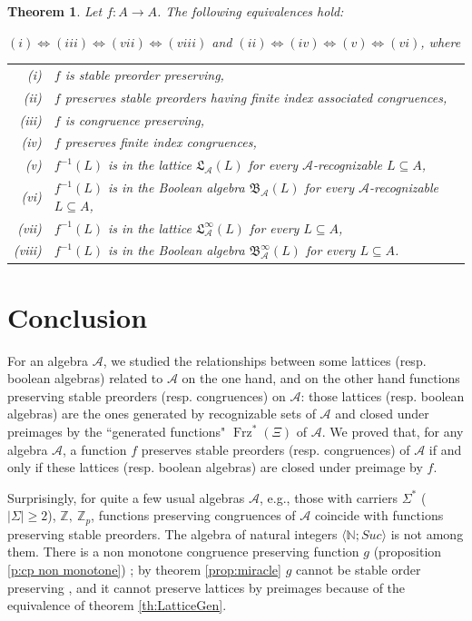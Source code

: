 \documentclass[11pt,a4paper]{article}
\newtheorem{theorem}{Theorem}[section]
\theoremstyle{definition} %
\newcommand\+[1]{\mathcal{#1}} %
\newcommand{\N}{{\mathbb N}}     %
\newcommand{\Z}{{\mathbb Z}}     %
\newcommand{\Bool}{{\mathfrak{B}}}   %
\newcommand{\Latt}{{\mathfrak{L}}}
\DeclareMathOperator{\freez}{Frz}%
\begin{document}
 \begin{theorem}\label{th Zhat}
 Let $f\colon  A\to A$. The following  equivalences hold:
 
  $(i)\Leftrightarrow(iii)\Leftrightarrow(vii)\Leftrightarrow(viii)$\quad
 and\quad
  $(ii)\Leftrightarrow(iv)\Leftrightarrow(v)\Leftrightarrow(vi)$, where
  
%
\begin{tabular}{ r  l }
(i) & $f$ is stable preorder preserving,
\\
(ii) & $f$ preserves stable preorders having finite index associated congruences,
\\
(iii) & $f$ is congruence preserving,
\\
(iv) &
$f$ preserves finite index congruences,
\\
(v) & $f^{-1}(L)$ is in the lattice $\Latt_{\+A}(L)$ for every $\+A$-recognizable $L\subseteq A$,
\\
(vi) &
 $f^{-1}(L)$ is in the Boolean algebra $\Bool_{\+A}(L)$ for every $\+A$-recognizable 
$L\subseteq A$,
\\
(vii) &  $f^{-1}(L)$ is in the lattice $\Latt^\infty_{\+A}(L)$ for every $L\subseteq A$,
\\
(viii) &  $f^{-1}(L)$ is in the Boolean algebra $\Bool^\infty_{\+A}(L)$ for every $L\subseteq A$.
\end{tabular}
 \end{theorem}
\section{Conclusion}\label{s conclusion}
For an algebra $\+A$,
we studied the relationships between some lattices  (resp. boolean algebras) related to $\+A$ on the one hand,   and on the other hand functions preserving stable preorders (resp. congruences) on $\+A$: those lattices  (resp. boolean algebras) are the ones generated by recognizable sets  of $\+A$ and closed under preimages by the ``generated functions"  $\freez^*(\Xi)$  of $\+A$. We proved that, for any algebra $\+A$, a function $f$ preserves stable preorders (resp. congruences) of $\+A$ if and only if  these lattices  (resp. boolean algebras)
are closed under preimage by $f$.

Surprisingly, for quite a few usual algebras $\+A$, e.g., those with carriers $\Sigma^*$ ($|\Sigma|\geq 2$),  $\Z,\ \Z_p$, functions  preserving congruences of $\+A$ coincide with functions preserving stable preorders. 
The algebra of natural integers $\langle  \N ;Suc\rangle$ is not among them.  There is a non monotone  congruence preserving function  $g$ (proposition \ref{p:cp non monotone}) ; by theorem \ref{prop:miracle}  $g$  cannot be stable order preserving , and it cannot preserve lattices by preimages because of the equivalence of theorem \ref{th:LatticeGen}. 
\end{document}

